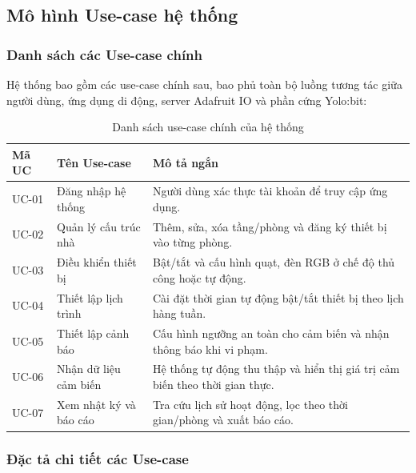 \subsection{Mô hình Use-case hệ thống}

\subsubsection{Danh sách các Use-case chính}

Hệ thống bao gồm các use-case chính sau, bao phủ toàn bộ luồng tương tác giữa người dùng, ứng dụng di động, server Adafruit IO và phần cứng Yolo:bit:

\begin{table}[H]
\centering
\caption{Danh sách use-case chính của hệ thống}
\renewcommand{\arraystretch}{1.4}
\begin{tabular}{|m{2cm}|m{4.5cm}|m{7.2cm}|}
\hline
\textbf{Mã UC} & \textbf{Tên Use-case} & \textbf{Mô tả ngắn} \\ \hline
UC-01 & Đăng nhập hệ thống         & Người dùng xác thực tài khoản để truy cập ứng dụng. \\ \hline
UC-02 & Quản lý cấu trúc nhà       & Thêm, sửa, xóa tầng/phòng và đăng ký thiết bị vào từng phòng. \\ \hline
UC-03 & Điều khiển thiết bị        & Bật/tắt và cấu hình quạt, đèn RGB ở chế độ thủ công hoặc tự động. \\ \hline
UC-04 & Thiết lập lịch trình       & Cài đặt thời gian tự động bật/tắt thiết bị theo lịch hàng tuần. \\ \hline
UC-05 & Thiết lập cảnh báo         & Cấu hình ngưỡng an toàn cho cảm biến và nhận thông báo khi vi phạm. \\ \hline
UC-06 & Nhận dữ liệu cảm biến      & Hệ thống tự động thu thập và hiển thị giá trị cảm biến theo thời gian thực. \\ \hline
UC-07 & Xem nhật ký và báo cáo     & Tra cứu lịch sử hoạt động, lọc theo thời gian/phòng và xuất báo cáo. \\ \hline
\end{tabular}
\end{table}

\subsubsection{Đặc tả chi tiết các Use-case}

